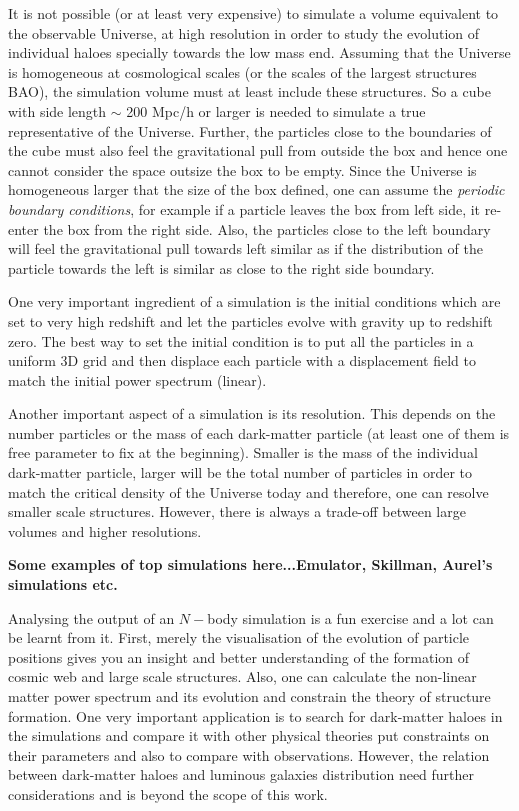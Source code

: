 It is not possible (or at least very expensive) to simulate a volume equivalent to the
observable Universe, at high resolution in order to study the evolution of individual
haloes specially towards the low mass end. Assuming that the Universe is homogeneous
at cosmological scales (or the scales of the largest structures BAO), the simulation
volume must at least include these structures. So a cube with side length $\sim$ 200 Mpc/h
or larger is needed to simulate a true representative of the Universe. Further, the
particles close to the boundaries of the cube must also feel the gravitational pull
from outside the box and hence one cannot consider the space outsize the box to be 
empty. Since the Universe is homogeneous larger that the size of the box defined, one
can assume the {\it periodic boundary conditions}, for example if a particle leaves the box from left
side, it re-enter the box from the right side. Also, the particles close to the left boundary
will feel the gravitational pull towards left similar as if the distribution of the particle
towards the left is similar as close to the right side boundary.

One very important ingredient of a simulation is the initial conditions which are
set to very high redshift and let the particles evolve with gravity up to redshift zero. 
The best way to set the initial condition is to put all the particles in a uniform 3D grid
and then displace each particle with a displacement field to match the initial power 
spectrum (linear). 

Another important aspect of a simulation is its resolution. This depends on the number 
particles or the mass of each dark-matter particle (at least one of them is free parameter 
to fix at the beginning). Smaller is the mass of the individual dark-matter particle, 
larger will be the total number of particles in order to match the critical density of 
the Universe today and therefore, one can resolve smaller scale structures. However, 
there is always a trade-off between large volumes and higher resolutions. 

{\bf Some examples of top simulations here...Emulator, Skillman, Aurel's simulations etc.} 

Analysing the output of an $N-$body simulation is a fun exercise and a lot can be learnt
from it. First, merely the visualisation of the evolution of particle positions gives
you an insight and better understanding of the formation of cosmic web and large
scale structures. Also, one can calculate the non-linear matter power spectrum and its
evolution and constrain the theory of structure formation. One very important
application is to search for dark-matter haloes in the simulations and compare
it with other physical theories put constraints on their parameters and also
to compare with observations. However, the relation between dark-matter haloes
and luminous galaxies distribution need further considerations and is beyond
the scope of this work. 

